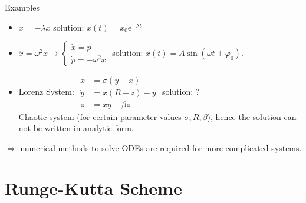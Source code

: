 \documentclass{beamer}
\newcommand{\e}{\mathrm{e}}
\begin{document}
\begin{frame}{Examples}
 \begin{itemize}
  \item $\dot x = -\lambda x$ \hspace{1cm} solution: $x(t) = x_0 \e^{-\lambda t}$
  \item $ \ddot x = \omega^2 x \rightarrow \begin{cases}\dot x = p \\ \dot p = -\omega^2 x \end{cases}$ \hspace{0cm} solution: $x(t) = A \sin(\omega t + \varphi_0)$.

\pause

  \item Lorenz System: $
\begin{aligned}
 \dot x &= \sigma ( y - x ) \\
 \dot y &= x( R - z ) - y \\
 \dot z &= xy - \beta z.
\end{aligned} $ \hspace{0.5cm} solution: ?\\
 Chaotic system (for certain parameter values $\sigma, R , \beta$), hence the solution can not be written in analytic form.
 \end{itemize}

\pause 
\vspace{1em}
$\Longrightarrow$ numerical methods to solve ODEs are required for more complicated systems.
\end{frame}


\section{Runge-Kutta Scheme}
\end{document}
